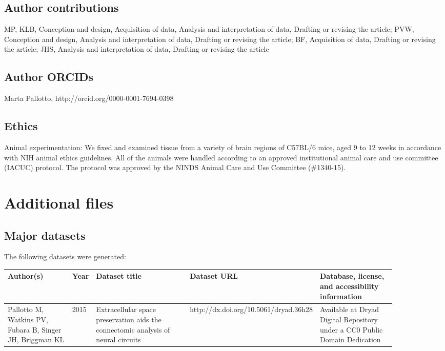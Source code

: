 \documentclass{article}
\begin{document}
\subsection*{Author contributions}

MP, KLB, Conception and design, Acquisition of data, Analysis and interpretation of data, Drafting or revising the article; PVW, Conception and design, Analysis and interpretation of data, Drafting or revising the article; BF, Acquisition of data, Drafting or revising the article; JHS, Analysis and interpretation of data, Drafting or revising the article

\subsection*{Author ORCIDs}

Marta Pallotto, http://orcid.org/0000-0001-7694-0398

\subsection*{Ethics}

Animal experimentation: We fixed and examined tissue from a variety of brain regions of C57BL/6 mice, aged 9 to 12 weeks in accordance with NIH animal ethics guidelines. All of the animals were handled according to an approved institutional animal care and use committee (IACUC) protocol. The protocol was approved by the NINDS Animal Care and Use Committee (\#1340-15).

\section*{Additional files}

\subsection*{Major datasets}

The following datasets were generated:

\begin{center}\small
\begin{tabular}{p{0.17\linewidth}p{0.06\linewidth}p{0.25\linewidth}p{0.2\linewidth}p{0.2\linewidth}}
\toprule
\textbf{Author(s)} & \textbf{Year} & \textbf{Dataset title} & \textbf{Dataset URL} & \textbf{Database, license, and accessibility information}\\
\midrule
Pallotto M, Watkins PV, Fubara B, Singer JH, Briggman KL & 2015 & Extracellular space preservation aids the connectomic analysis of neural circuits & http://dx.doi.org/10.5061/dryad.36h28 & Available at Dryad Digital Repository under a CC0 Public Domain Dedication\\
\bottomrule
\end{tabular}
\end{center}
\end{document}
